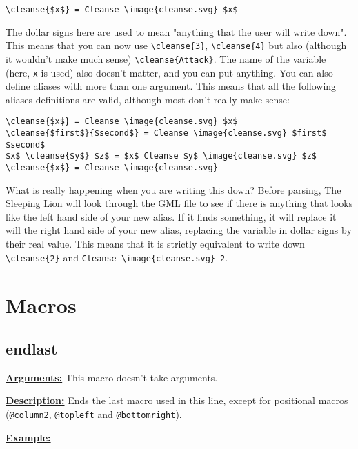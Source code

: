 \documentclass{article}
\begin{document}
\begin{center}
\begin{BVerbatim}
\cleanse{$x$} = Cleanse \image{cleanse.svg} $x$
\end{BVerbatim}
\end{center}

The dollar signs here are used to mean "anything that the user will write down". This means that you can now use \verb`\cleanse{3}`, \verb`\cleanse{4}` but also (although it wouldn't make much sense) \verb`\cleanse{Attack}`. The name of the variable (here, \verb`x` is used) also doesn't matter, and you can put anything. You can also define aliases with more than one argument. This means that all the following aliases definitions are valid, although most don't really make sense:

\begin{center}
\begin{BVerbatim}
\cleanse{$x$} = Cleanse \image{cleanse.svg} $x$
\cleanse{$first$}{$second$} = Cleanse \image{cleanse.svg} $first$ $second$
$x$ \cleanse{$y$} $z$ = $x$ Cleanse $y$ \image{cleanse.svg} $z$
\cleanse{$x$} = Cleanse \image{cleanse.svg}
\end{BVerbatim}
\end{center}

What is really happening when you are writing this down? Before parsing, The Sleeping Lion will look through the GML file to see if there is anything that looks like the left hand side of your new alias. If it finds something, it will replace it will the right hand side of your new alias, replacing the variable in dollar signs by their real value. This means that it is strictly equivalent to write down \verb`\cleanse{2}` and \verb`Cleanse \image{cleanse.svg} 2`.

\pagebreak

\section{Macros}

\subsection{endlast}
\textbf{\underline{Arguments:}} This macro doesn't take arguments.

\textbf{\underline{Description:}} Ends the last macro used in this line, except for positional macros (\verb`@column2`, \verb`@topleft` and \verb`@bottomright`).

\textbf{\underline{Example:}}
\end{document}
